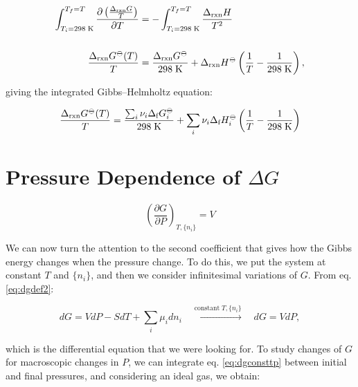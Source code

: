 \documentclass[
  9pt,
]{extbook}
\theoremstyle{definition}
\theoremstyle{definition}
\theoremstyle{definition}
\theoremstyle{definition}
\theoremstyle{remark}
\begin{document}
\begin{equation}
\begin{aligned}
\int_{T_i=298 \;\text{K}}^{T_f=T}  \frac{\partial\left( \frac{\Delta_{\text{rxn}} G}{T} \right)}{\partial T} &=  - \int_{T_i=298 \;\text{K}}^{T_f=T}  \frac{\Delta_{\text{rxn}} H}{T^2} \\ \\ \frac{\Delta_{\text{rxn}} G^{-\kern-6pt{\ominus}\kern-6pt-}(T)}{T} &=  \frac{\Delta_{\text{rxn}} G^{-\kern-6pt{\ominus}\kern-6pt-}}{298 \;\text{K}} + \Delta_{\text{rxn}} H^{-\kern-6pt{\ominus}\kern-6pt-}\left( \frac{1}{T} -\frac{1}{298 \;\text{K}} \right),
\end{aligned}
\label{eq:gibbshelmIbase}
\end{equation}

giving the integrated Gibbs--Helmholtz equation:

\begin{equation}
\frac{\Delta_{\text{rxn}} G^{-\kern-6pt{\ominus}\kern-6pt-}(T)}{T} =  \frac{\sum_i \nu_i \Delta_{\text{f}} G_i^{-\kern-6pt{\ominus}\kern-6pt-}}{298 \;\text{K}} + \sum_i \nu_i \Delta_{\text{f}} H_i^{-\kern-6pt{\ominus}\kern-6pt-}\left( \frac{1}{T} -\frac{1}{298 \;\text{K}} \right)
\label{eq:gibbshelmI}
\end{equation}

\section{\texorpdfstring{Pressure Dependence of \(\Delta G\)}{Pressure Dependence of \textbackslash Delta G}}\label{pressure-dependence-of-delta-g}

\[\left(\frac{\partial G}{\partial P} \right)_{T,\{n_i\}}=V\]

We can now turn the attention to the second coefficient that gives how the Gibbs energy changes when the pressure change. To do this, we put the system at constant \(T\) and \(\{n_i\}\), and then we consider infinitesimal variations of \(G\). From eq. \eqref{eq:dgdef2}:

\begin{equation}
dG = VdP -SdT +\sum_i\mu_i dn_i \quad \xrightarrow{\text{constant}\; T,\{n_i\}} \quad dG = VdP,
\label{eq:dgconsttp}
\end{equation}

which is the differential equation that we were looking for. To study changes of \(G\) for macroscopic changes in \(P\), we can integrate eq. \eqref{eq:dgconsttp} between initial and final pressures, and considering an ideal gas, we obtain:
\end{document}
